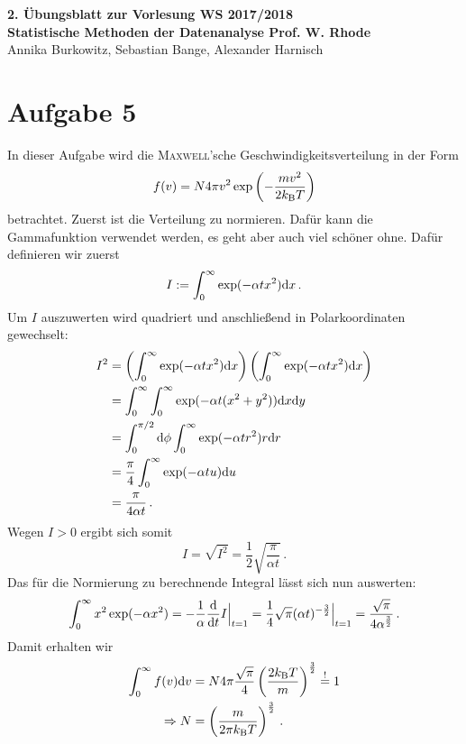 \documentclass[a4paper, 11pt]{article}
\begin{document}
\noindent
\large{\textbf{2. Übungsblatt zur Vorlesung \hfill WS 2017/2018 \\
Statistische Methoden der Datenanalyse \hfill Prof. W. Rhode}} \\
Annika Burkowitz, Sebastian Bange, Alexander Harnisch \\
\noindent\makebox[\linewidth]{\rule{\textwidth}{0.4pt}}

\section*{Aufgabe 5}
In dieser Aufgabe wird die \textsc{Maxwell}'sche Geschwindigkeitsverteilung in der Form
\begin{equation}
    f(v) = N 4 \pi v^2 \exp\left(-\frac{mv^2}{2k_\textup{B}T}\right)
    \label{eqn:f}
\end{equation}
betrachtet. Zuerst ist die Verteilung zu normieren. Dafür kann die Gammafunktion verwendet werden, es geht aber auch viel schöner ohne. Dafür definieren wir zuerst
\begin{equation}
    I := \int_{0}^{\infty} \exp(-\alpha t x^2)\textup{d}x\,.
    \label{eqn:I}
\end{equation}
Um $I$ auszuwerten wird quadriert und anschließend in Polarkoordinaten gewechselt:
\begin{align}
    I^2 &= \left(\int_{0}^{\infty} \exp(-\alpha tx^2)\textup{d}x\right)\left(\int_{0}^{\infty} \exp(-\alpha tx^2)\textup{d}x\right) \\
    &= \int_{0}^{\infty}\int_{0}^{\infty} \exp(-\alpha t(x^2 + y^2))\textup{d}x \textup{d}y \\
    &= \int_{0}^{\pi/2}\textup{d}\phi\int_{0}^{\infty}\exp(-\alpha t r^2)r \textup{d}r \\
    &= \frac{\pi}{4} \int_{0}^{\infty} \exp(-\alpha t u) \textup{d} u \\
    &= \frac{\pi}{4\alpha t} \,.
\end{align}
Wegen $I > 0$ ergibt sich somit
\begin{equation}
    I = \sqrt{I^2} = \frac{1}{2} \sqrt{\frac{\pi}{\alpha t}}\,.
    \label{eqn:I_sol}
\end{equation}
Das für die Normierung zu berechnende Integral lässt sich nun auswerten:
\begin{equation}
    \int_{0}^{\infty} x^2\exp(-\alpha x^2) = - \frac{1}{\alpha} \frac{\textup{d}}{\textup{d}t} I\Big|_{t = 1} = \frac{1}{4}\sqrt{\pi}(\alpha t)^{-\frac{3}{2}}\Big|_{t=1} = \frac{\sqrt{\pi}}{4 \alpha^{\frac{3}{2}}} \,.
\end{equation}
Damit erhalten wir
\begin{align}
    \int_{0}^{\infty} f(v) \textup{d}v &= N 4 \pi \frac{\sqrt{\pi}}{4}\left(\frac{2k_{\textup{B}}T}{m}\right)^{\frac{3}{2}} \stackrel{\textup{!}}{=} 1 \\
    \Rightarrow N &= \left(\frac{m}{2\pi k_\textup{B}T}\right)^{\frac{3}{2}} \,.
    \label{eqn:N}
\end{align}
\end{document}

